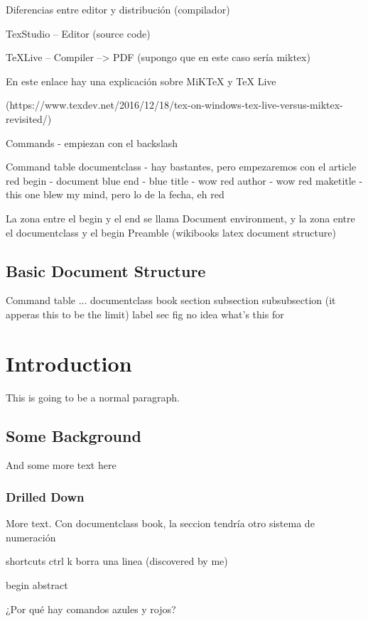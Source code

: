 \documentclass{article}
\begin{document}
	Diferencias entre editor y distribución (compilador)
	
	TexStudio -- Editor (source code)
	
	TeXLive -- Compiler --> PDF (supongo que en este caso sería miktex)
	
	En este enlace hay una explicación sobre MiKTeX y TeX Live
	
	 (https://www.texdev.net/2016/12/18/tex-on-windows-tex-live-versus-miktex-revisited/)
	
	Commands - empiezan con el backslash
	
	Command table documentclass - hay bastantes, pero empezaremos con el article red
	begin - document blue
	end - blue
			title - wow red
			author - wow red
			maketitle - this one blew my mind, pero lo de la fecha, eh red
			
	La zona entre el begin y el end se llama Document environment, y la zona entre el documentclass y el begin Preamble (wikibooks latex document structure)
	
	\subsection{Basic Document Structure}
	
	Command table ...
	documentclass book
	section
	subsection
	subsubsection (it apperas this to be the limit)
	label sec fig no idea what's this for
	
	\section{Introduction}
	This is going to be a normal paragraph.
	\subsection{Some Background}
	And some more text here
	\subsubsection{Drilled Down}\label{sec:drilled-down}
	More text.		
	Con documentclass book, la seccion tendría otro sistema de numeración
	
	shortcuts ctrl k borra una linea (discovered by me)
	
	begin abstract
	
	¿Por qué hay comandos azules y rojos?
	

	
\end{document}
